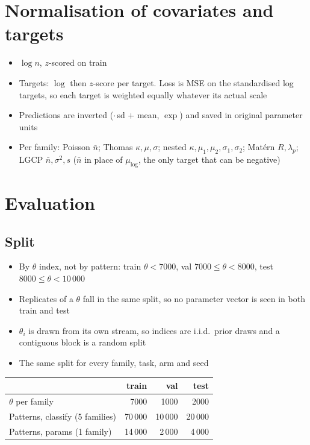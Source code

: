 \documentclass[11pt]{article}
\newcommand{\nb}{\bar n}
\begin{document}
\section{Normalisation of covariates and targets}
\begin{itemize}
  \item $\log n$, $z$-scored on train
  \item Targets: $\log$ then $z$-score per target. Loss is MSE on the standardised log targets, so each target is weighted equally whatever its actual scale
  \item Predictions are inverted ($\cdot\,$sd $+$ mean, $\exp$) and saved in original parameter units
  \item Per family: Poisson $\nb$; Thomas $\kappa,\mu,\sigma$; nested $\kappa,\mu_1,\mu_2,\sigma_1,\sigma_2$; Mat\'ern $R,\lambda_p$; LGCP $\nb,\sigma^2,s$ ($\nb$ in place of $\mu_{\log}$, the only target that can be negative)
\end{itemize}

\section{Evaluation}

\subsection*{Split}
\begin{itemize}
  \item By $\theta$ index, not by pattern: train $\theta<7000$, val $7000\le\theta<8000$, test $8000\le\theta<10\,000$
  \item Replicates of a $\theta$ fall in the same split, so no parameter vector is seen in both train and test
  \item $\theta_i$ is drawn from its own stream, so indices are i.i.d.\ prior draws and a contiguous block is a random split
  \item The same split for every family, task, arm and seed
\end{itemize}

\smallskip
\begin{tabular}{@{}lrrr@{}}
\toprule
 & train & val & test \\
\midrule
$\theta$ per family & 7000 & 1000 & 2000 \\
Patterns, classify (5 families) & 70\,000 & 10\,000 & 20\,000 \\
Patterns, params (1 family) & 14\,000 & 2\,000 & 4\,000 \\
\bottomrule
\end{tabular}
\end{document}
